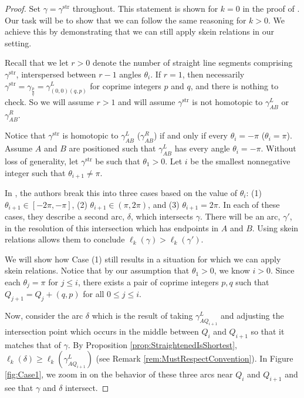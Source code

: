 \documentclass[12pt, letterpaper,table]{amsart}
\theoremstyle{remark}
\newcommand{\fpq}{\frac{p}{q}}
\newcommand{\stir}{\mathrm{str}}
\begin{document}
\begin{proof}
Set $\gamma = \gamma^\stir$ throughout. This statement is shown for $k =0$ in the proof of \cite[Theorem 3.5]{LLRS}. Our task will be to show that we can follow the same reasoning for $k >0$. We achieve this by demonstrating that we can still apply skein relations in our setting. 

 Recall that we let $r > 0$ denote the number of straight line segments comprising $\gamma^\stir$, interspersed between $r-1$ angles $\theta_i$. If $r = 1$, then necessarily $\gamma^\stir = \gamma_\fpq = \gamma_{(0,0)(q,p)}^L$ for coprime integers $p$ and $q$, and there is nothing to check. So we will assume $r > 1$ and will assume $\gamma^\stir$ is not homotopic to $\gamma_{AB}^L$ or $\gamma_{AB}^R$.

Notice that $\gamma^\stir$ is homotopic to $\gamma_{AB}^L$ ($\gamma_{AB}^R$) if and only if every $\theta_i = -\pi$ ($\theta_i = \pi$).  Assume $A$ and $B$ are positioned such that $\gamma_{AB}^L$ has every angle $\theta_i = -\pi$. Without loss of generality, let $\gamma^\stir$ be such that $\theta_1 > 0$. Let $i$ be the smallest nonnegative integer such that $\theta_{i+1} \neq \pi$. 

In \cite{LLRS}, the authors break this into three cases based on the value of $\theta_i$: (1) $\theta_{i+1} \in [-2\pi,-\pi]$, (2) $\theta_{i+1} \in (\pi,2\pi)$, and (3) $\theta_{i+1} = 2\pi$. In each of these cases, they describe a second arc, $\delta$, which intersects $\gamma$. There will be an arc, $\gamma'$, in the resolution of this intersection which has endpoints in $A$ and $B$. Using skein relations allows them to conclude $\ell_k(\gamma) > \ell_k(\gamma')$. 

We will show how Case (1) still results in a situation for which we can apply skein relations. Notice that by our assumption that $\theta_1 > 0$, we know $i >0$. Since each $\theta_j = \pi$ for $j \leq i$, there exists a pair of coprime integers $p,q$ such that $Q_{j+1} = Q_j + (q,p)$ for all $0 \leq j \leq i$. 

Now, consider the arc $\delta$ which is the result of taking $\gamma_{AQ_{i+1}}^L$ and adjusting the intersection point which occurs in the middle between $Q_i$ and $Q_{i+1}$ so that it matches that of $\gamma$. By Proposition \ref{prop:StraightenedIsShortest}, $\ell_k(\delta) \geq \ell_k(\gamma_{AQ_{i+1}}^L)$ (see Remark \ref{rem:MustRespectConvention}). In Figure \ref{fig:Case1}, we zoom in on the behavior of these three arcs near $Q_i$ and $Q_{i+1}$ and see that $\gamma$ and $\delta$ intersect. 


\end{proof}
\end{document}
